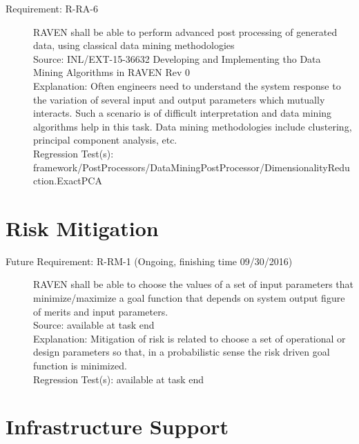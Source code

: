 \documentclass{article}
\newcommand{\requirement}[5]{\item[Requirement: #1] #2 \\Source: #3\\Explanation: #4\\Regression Test(s): #5}
\newcommand{\futurerequirement}[6]{\item[Future Requirement: #1 #6] #2 \\Source: #3\\Explanation: #4\\Regression Test(s): #5}
\begin{document}
\begin{description}
\requirement{R-RA-6}{RAVEN shall be able to perform advanced post processing of generated data, using classical data mining methodologies}
{INL/EXT-15-36632 Developing and Implementing tho Data Mining Algorithms in RAVEN Rev 0}
{Often engineers need to understand the system response to the variation of several input and output parameters which mutually interacts. Such a scenario is of difficult interpretation and data mining algorithms help in this task.  Data mining methodologies include clustering, principal component analysis, etc.}
{framework/PostProcessors/DataMiningPostProcessor\-/DimensionalityReduction.ExactPCA}


\end{description}

\section{Risk Mitigation}

\begin{description}

\futurerequirement{R-RM-1}{RAVEN shall be able to choose the values of a set of input parameters that minimize/maximize a goal function that depends on system output figure of merits and input parameters.}
{available at task end}
{Mitigation of risk is related to choose a set of operational or design parameters so that, in a probabilistic sense the risk driven goal function is minimized.}
{available at task end}
{(Ongoing, finishing time 09/30/2016)}
\end{description}

\section{Infrastructure Support}
\end{document}
